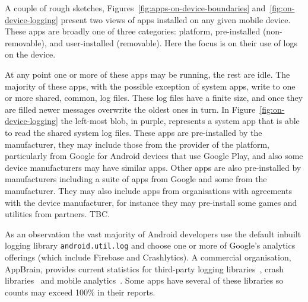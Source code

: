A couple of rough sketches, Figures~\ref{fig:apps-on-device-boundaries} and~\ref{fig:on-device-logging} present two views of apps installed on any given mobile device. These apps are broadly one of three categories: platform, pre-installed (non-removable), and user-installed (removable). Here the focus is on their use of logs on the device.

At any point one or more of these apps may be running, the rest are idle. The majority of these apps, with the possible exception of system apps, write to one or more shared, common, log files. These log files have a finite size, and once they are filled newer messages overwrite the oldest ones in turn. In Figure~\ref{fig:on-device-logging} the left-most blob, in purple, represents a system app that is able to read the shared system log files. These apps are pre-installed by the manufacturer, they may include those from the provider of the platform, particularly from Google for Android devices that use Google Play, and also some device manufacturers may have similar apps. Other apps are also pre-installed by manufacturers including a suite of apps from Google and some from the manufacturer. They may also include apps from organisations with agreements with the device manufacturer, for instance they may pre-install some games and utilities from partners. TBC.


As an observation the vast majority of Android developers use the default inbuilt logging library \texttt{android.util.log} and choose one or more of Google's analytics offerings (which include Firebase and Crashlytics). A commercial organisation, AppBrain, provides current statistics for third-party logging libraries~, crash libraries~ and mobile analytics~. Some apps have several of these libraries so counts may exceed 100\% in their reports.

